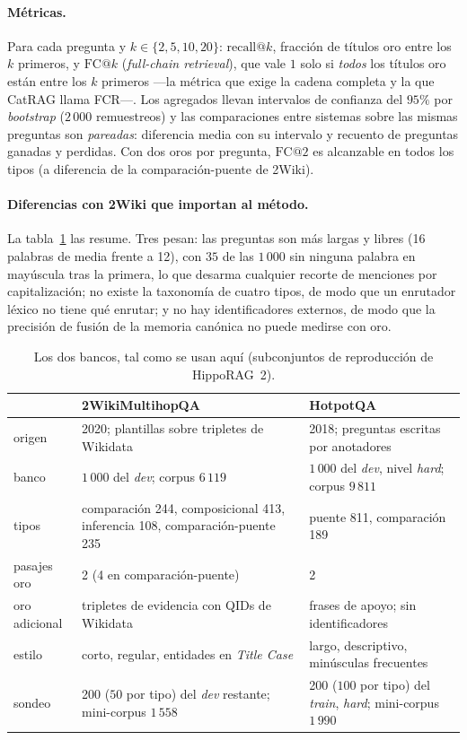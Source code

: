 \documentclass[11pt,a4paper]{article}
\newcommand{\hippo}{HippoRAG~2}
\begin{document}
\paragraph{Métricas.}
Para cada pregunta y $k\in\{2,5,10,20\}$: $\mathrm{recall@}k$, fracción de
títulos oro entre los $k$ primeros, y $\mathrm{FC@}k$ (\emph{full-chain
retrieval}), que vale $1$ solo si \emph{todos} los títulos oro están entre los
$k$ primeros ---la métrica que exige la cadena completa y la que CatRAG
llama FCR---. Los agregados llevan intervalos de confianza del $95\%$ por
\emph{bootstrap} ($2\,000$ remuestreos) y las comparaciones entre sistemas
sobre las mismas preguntas son \emph{pareadas}: diferencia media con su
intervalo y recuento de preguntas ganadas y perdidas. Con dos oros por
pregunta, $\mathrm{FC@}2$ es alcanzable en todos los tipos (a diferencia de
la comparación-puente de 2Wiki).

\paragraph{Diferencias con 2Wiki que importan al método.}
La tabla~\ref{tab:diferencias} las resume. Tres pesan: las preguntas son más
largas y libres (16 palabras de media frente a 12), con $35$ de las $1\,000$
sin ninguna palabra en mayúscula tras la primera, lo que desarma cualquier
recorte de menciones por capitalización; no existe la taxonomía de cuatro
tipos, de modo que un enrutador léxico no tiene qué enrutar; y no hay
identificadores externos, de modo que la precisión de fusión de la memoria
canónica no puede medirse con oro.

\begin{table}[t]
\centering\footnotesize\setlength{\tabcolsep}{4pt}
\caption{Los dos bancos, tal como se usan aquí (subconjuntos de reproducción
de \hippo{}).}
\label{tab:diferencias}
\begin{tabular}{p{}p{}p{}}
\toprule
 & 2WikiMultihopQA & HotpotQA\\
\midrule
origen & 2020; plantillas sobre tripletes de Wikidata & 2018; preguntas escritas por anotadores\\
banco & $1\,000$ del \emph{dev}; corpus $6\,119$ & $1\,000$ del \emph{dev}, nivel \emph{hard}; corpus $9\,811$\\
tipos & comparación 244, composicional 413, inferencia 108, comparación-puente 235 & puente 811, comparación 189\\
pasajes oro & 2 (4 en comparación-puente) & 2\\
oro adicional & tripletes de evidencia con QIDs de Wikidata & frases de apoyo; sin identificadores\\
estilo & corto, regular, entidades en \emph{Title Case} & largo, descriptivo, minúsculas frecuentes\\
sondeo & 200 ($50$ por tipo) del \emph{dev} restante; mini-corpus $1\,558$ & 200 ($100$ por tipo) del \emph{train}, \emph{hard}; mini-corpus $1\,990$\\
\bottomrule
\end{tabular}
\end{table}
\end{document}
